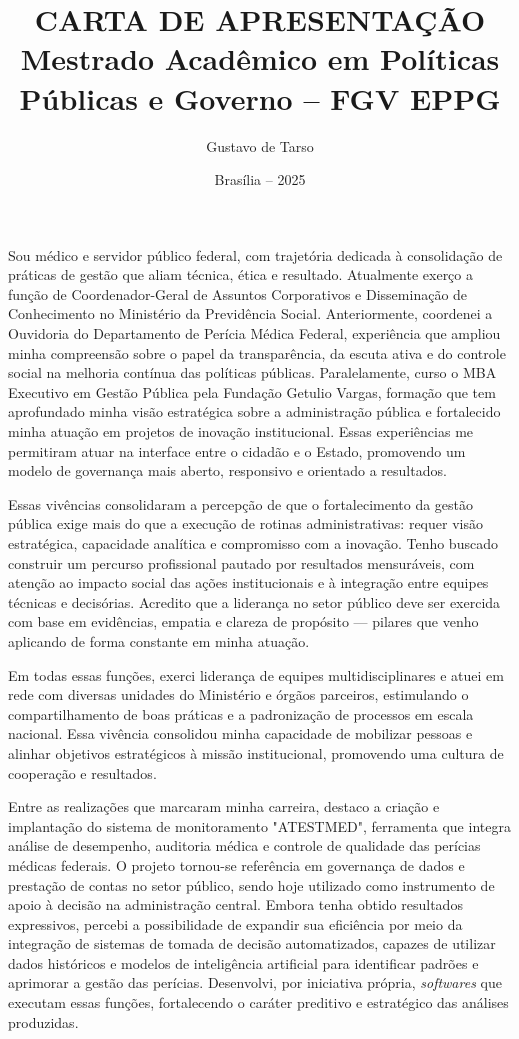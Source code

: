 \documentclass[12pt]{article}
\author{Gustavo de Tarso}
\date{Brasília – 2025}
\title{CARTA DE APRESENTAÇÃO\\\medskip
\large Mestrado Acadêmico em Políticas Públicas e Governo – FGV EPPG}
\begin{document}
\maketitle
Sou médico e servidor público federal, com trajetória dedicada à consolidação de práticas de gestão que aliam técnica, ética e resultado. Atualmente exerço a função de Coordenador-Geral de Assuntos Corporativos e Disseminação de Conhecimento no Ministério da Previdência Social. Anteriormente, coordenei a Ouvidoria do Departamento de Perícia Médica Federal, experiência que ampliou minha compreensão sobre o papel da transparência, da escuta ativa e do controle social na melhoria contínua das políticas públicas. Paralelamente, curso o MBA Executivo em Gestão Pública pela Fundação Getulio Vargas, formação que tem aprofundado minha visão estratégica sobre a administração pública e fortalecido minha atuação em projetos de inovação institucional. Essas experiências me permitiram atuar na interface entre o cidadão e o Estado, promovendo um modelo de governança mais aberto, responsivo e orientado a resultados.

Essas vivências consolidaram a percepção de que o fortalecimento da gestão pública exige mais do que a execução de rotinas administrativas: requer visão estratégica, capacidade analítica e compromisso com a inovação. Tenho buscado construir um percurso profissional pautado por resultados mensuráveis, com atenção ao impacto social das ações institucionais e à integração entre equipes técnicas e decisórias. Acredito que a liderança no setor público deve ser exercida com base em evidências, empatia e clareza de propósito — pilares que venho aplicando de forma constante em minha atuação.

Em todas essas funções, exerci liderança de equipes multidisciplinares e atuei em rede com diversas unidades do Ministério e órgãos parceiros, estimulando o compartilhamento de boas práticas e a padronização de processos em escala nacional. Essa vivência consolidou minha capacidade de mobilizar pessoas e alinhar objetivos estratégicos à missão institucional, promovendo uma cultura de cooperação e resultados.

Entre as realizações que marcaram minha carreira, destaco a criação e implantação do sistema de monitoramento "ATESTMED", ferramenta que integra análise de desempenho, auditoria médica e controle de qualidade das perícias médicas federais. O projeto tornou-se referência em governança de dados e prestação de contas no setor público, sendo hoje utilizado como instrumento de apoio à decisão na administração central. Embora tenha obtido resultados expressivos, percebi a possibilidade de expandir sua eficiência por meio da integração de sistemas de tomada de decisão automatizados, capazes de utilizar dados históricos e modelos de inteligência artificial para identificar padrões e aprimorar a gestão das perícias. Desenvolvi, por iniciativa própria, \emph{softwares} que executam essas funções, fortalecendo o caráter preditivo e estratégico das análises produzidas.
\end{document}
